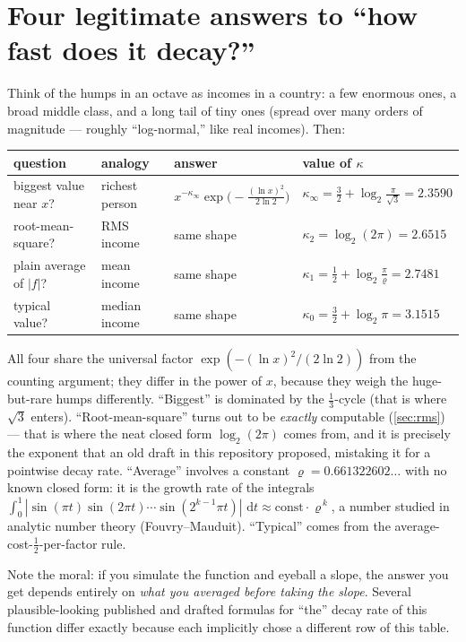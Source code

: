 \documentclass[11pt,oneside]{article}
\theoremstyle{remark}
\newcommand{\dd}{\,\mathrm d}
\begin{document}
\section{Four legitimate answers to ``how fast does it decay?''}
\label{sec:four}

Think of the humps in an octave as incomes in a country: a few
enormous ones, a broad middle class, and a long tail of tiny ones
(spread over many orders of magnitude --- roughly ``log-normal,'' like
real incomes).  Then:

\begin{center}
\begin{tabularx}{\textwidth}{@{}lllX@{}}
\toprule
question & analogy & answer & value of $\kappa$\\
\midrule
biggest value near $x$? & richest person &
$x^{-\kappa_\infty}\exp\bigl(-\tfrac{(\ln x)^2}{2\ln2}\bigr)$ &
$\kappa_\infty=\tfrac32+\log_2\tfrac{\pi}{\sqrt3}=2.3590$\\[0.3em]
root-mean-square? & RMS income &
same shape & $\kappa_2=\log_2(2\pi)=2.6515$\\[0.3em]
plain average of $|f|$? & mean income &
same shape & $\kappa_1=\tfrac12+\log_2\tfrac{\pi}{\varrho}=2.7481$\\[0.3em]
typical value? & median income &
same shape & $\kappa_0=\tfrac32+\log_2\pi=3.1515$\\
\bottomrule
\end{tabularx}
\end{center}

All four share the universal factor
$\exp(-(\ln x)^2/(2\ln2))$ from the counting argument; they differ in
the power of $x$, because they weigh the huge-but-rare humps
differently.  ``Biggest'' is dominated by the $\tfrac13$-cycle
(that is where $\sqrt3$ enters).  ``Root-mean-square'' turns out to be
\emph{exactly} computable (\cref{sec:rms}) --- that is where the neat
closed form $\log_2(2\pi)$ comes from, and it is precisely the
exponent that an old draft in this repository proposed, mistaking it
for a pointwise decay rate.  ``Average'' involves a constant
$\varrho=0.661322602\ldots$ with no known closed form: it is the
growth rate of the integrals
$\int_0^1|\sin(\pi t)\sin(2\pi t)\cdots\sin(2^{k-1}\pi t)|\,\dd t
\approx\text{const}\cdot\varrho^{\,k}$, a number studied in analytic
number theory (Fouvry--Mauduit).  ``Typical'' comes from the
average-cost-$\tfrac12$-per-factor rule.

Note the moral: if you simulate the function and eyeball a slope, the
answer you get depends entirely on \emph{what you averaged before
taking the slope}.  Several plausible-looking published and drafted
formulas for ``the'' decay rate of this function differ exactly
because each implicitly chose a different row of this table.
\end{document}
